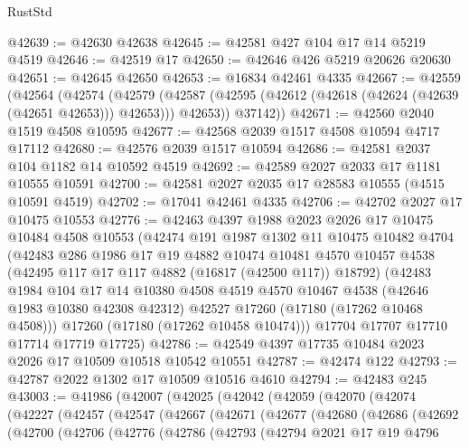 \begin{lexlean}{RustStd}
\begin{coremodule}
@42639 := @42630 @42638
@42645 := @42581 @427 @104 @17 @14 @5219 @4519
@42646 := @42519 @17
@42650 := @42646 @426 @5219 @20626 @20630
@42651 := @42645 @42650
@42653 := @16834 @42461 @4335
@42667 := @42559
    (@42564
      (@42574
        (@42579 (@42587 (@42595 (@42612 (@42618 (@42624 (@42639 (@42651 @42653))) @42653))) @42653))
        @37142))
@42671 := @42560 @2040 @1519 @4508 @10595
@42677 := @42568 @2039 @1517 @4508 @10594 @4717 @17112
@42680 := @42576 @2039 @1517 @10594
@42686 := @42581 @2037 @104 @1182 @14 @10592 @4519
@42692 := @42589 @2027 @2033 @17 @1181 @10555 @10591
@42700 := @42581 @2027 @2035 @17 @28583 @10555 (@4515 @10591 @4519)
@42702 := @17041 @42461 @4335
@42706 := @42702 @2027 @17 @10475 @10553
@42776 := @42463
    @4397
    @1988
    @2023
    @2026
    @17
    @10475
    @10484
    @4508
    @10553
    (@42474
      @191
      @1987
      @1302
      @11
      @10475
      @10482
      @4704
      (@42483
        @286
        @1986
        @17
        @19
        @4882
        @10474
        @10481
        @4570
        @10457
        @4538
        (@42495 @117 @17 @117 @4882 (@16817 (@42500 @117)) @18792)
        (@42483
          @1984
          @104
          @17
          @14
          @10380
          @4508
          @4519
          @4570
          @10467
          @4538
          (@42646 @1983 @10380 @42308 @42312)
          @42527
          @17260
          (@17180 (@17262 @10468 @4508)))
        @17260
        (@17180 (@17262 @10458 @10474)))
      @17704
      @17707
      @17710
      @17714
      @17719
      @17725)
@42786 := @42549 @4397 @17735 @10484 @2023 @2026 @17 @10509 @10518 @10542 @10551
@42787 := @42474 @122
@42793 := @42787 @2022 @1302 @17 @10509 @10516 @4610
@42794 := @42483 @245
@43003 := @41986
    (@42007
      (@42025
        (@42042
          (@42059
            (@42070
              (@42074
                (@42227
                  (@42457
                    (@42547
                      (@42667
                        (@42671
                          (@42677
                            (@42680
                              (@42686
                                (@42692
                                  (@42700
                                    (@42706
                                      (@42776
                                        (@42786
                                          (@42793
                                            (@42794
                                              @2021
                                              @17
                                              @19
                                              @4796

\end{coremodule}
\end{lexlean}
